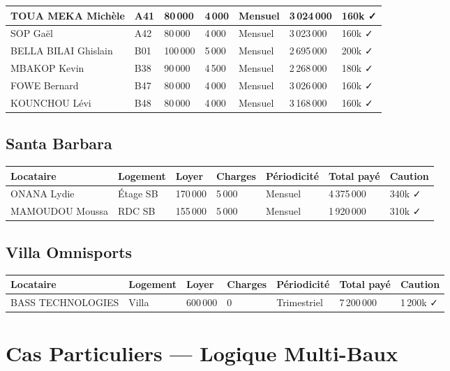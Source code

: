 \documentclass[a4paper,11pt]{article}
\begin{document}
\begin{longtable}{|p{3.5cm}|p{2.5cm}|p{1.5cm}|p{1.5cm}|p{2cm}|p{2cm}|p{2cm}|}
TOUA MEKA Michèle & A41 & 80\,000 & 4\,000 & Mensuel & 3\,024\,000 & 160k ✓ \\
\hline
SOP Gaël & A42 & 80\,000 & 4\,000 & Mensuel & 3\,023\,000 & 160k ✓ \\
\hline
BELLA BILAI Ghislain & B01 & 100\,000 & 5\,000 & Mensuel & 2\,695\,000 & 200k ✓ \\
\hline
MBAKOP Kevin & B38 & 90\,000 & 4\,500 & Mensuel & 2\,268\,000 & 180k ✓ \\
\hline
FOWE Bernard & B47 & 80\,000 & 4\,000 & Mensuel & 3\,026\,000 & 160k ✓ \\
\hline
KOUNCHOU Lévi & B48 & 80\,000 & 4\,000 & Mensuel & 3\,168\,000 & 160k ✓ \\
\hline
\end{longtable}

\subsection{Santa Barbara}

\begin{longtable}{|p{3.5cm}|p{3cm}|p{1.5cm}|p{1.5cm}|p{2cm}|p{2cm}|p{2cm}|}
\hline
\textbf{Locataire} & \textbf{Logement} & \textbf{Loyer} & \textbf{Charges} & \textbf{Périodicité} & \textbf{Total payé} & \textbf{Caution} \\
\hline
ONANA Lydie & Étage SB & 170\,000 & 5\,000 & Mensuel & 4\,375\,000 & 340k ✓ \\
\hline
MAMOUDOU Moussa & RDC SB & 155\,000 & 5\,000 & Mensuel & 1\,920\,000 & 310k ✓ \\
\hline
\end{longtable}

\subsection{Villa Omnisports}

\begin{longtable}{|p{4cm}|p{2cm}|p{1.5cm}|p{1.5cm}|p{2.5cm}|p{2cm}|p{2cm}|}
\hline
\textbf{Locataire} & \textbf{Logement} & \textbf{Loyer} & \textbf{Charges} & \textbf{Périodicité} & \textbf{Total payé} & \textbf{Caution} \\
\hline
BASS TECHNOLOGIES & Villa & 600\,000 & 0 & Trimestriel & 7\,200\,000 & 1\,200k ✓ \\
\hline
\end{longtable}

\section{Cas Particuliers — Logique Multi-Baux}
\end{document}
